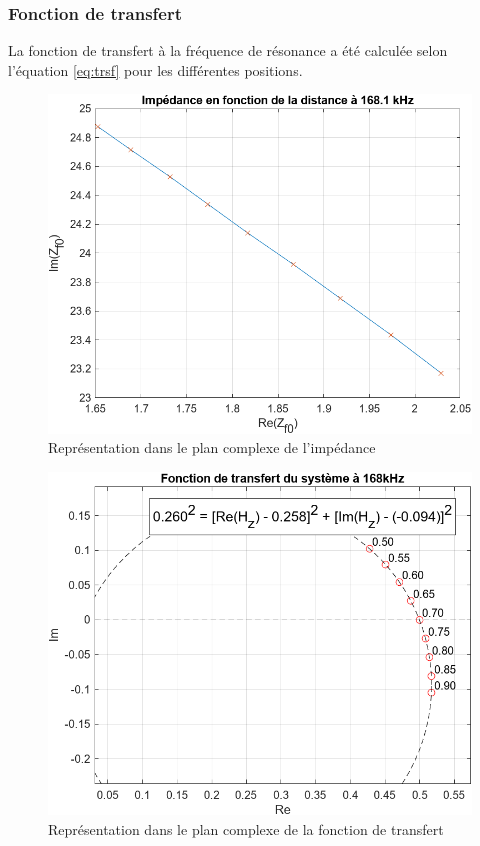 \subsubsection{Fonction de transfert}
La fonction de transfert à la fréquence de résonance a été calculée selon l'équation \ref{eq:trsf}
pour les différentes positions.
\begin{figure}[H]
    \centering
    \includegraphics[width=15cm]{Images/Seance2/impedance_complexe_168.png}
    \caption{Représentation dans le plan complexe de l'impédance}
    \label{fig:impe}
\end{figure}

\begin{figure}[H]
    \centering
    \includegraphics[width=15cm]{Images/Seance2/Cercle.png}
    \caption{Représentation dans le plan complexe de la fonction de transfert}
    \label{fig:transf}
\end{figure}

